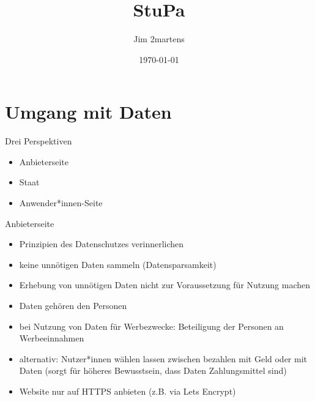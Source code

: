 \documentclass{beamer}
\begin{document}
\author{Jim 2martens}
\title{StuPa}
\date{\today}

\begin{frame}
    \titlepage
\end{frame}

\begin{frame}
    \tableofcontents
\end{frame}

\section{Umgang mit Daten}
\begin{frame}{Drei Perspektiven}
    \begin{itemize}
        \item Anbieterseite
        \vfill
        \item Staat
        \vfill
        \item Anwender*innen-Seite
    \end{itemize}
\end{frame}

\begin{frame}{Anbieterseite}
    \begin{itemize}
        \item Prinzipien des Datenschutzes verinnerlichen
        \vfill
        \item keine unnötigen Daten sammeln (Datensparsamkeit)
        \vfill
        \item Erhebung von unnötigen Daten nicht zur Voraussetzung für Nutzung
              machen
        \vfill
        \item Daten gehören den Personen
        \vfill
        \item bei Nutzung von Daten für Werbezwecke: Beteiligung der Personen
              an Werbeeinnahmen
        \vfill
        \item alternativ: Nutzer*innen wählen lassen zwischen bezahlen mit Geld
              oder mit Daten (sorgt für höheres Bewusstsein, dass Daten
              Zahlungsmittel sind)
        \vfill
        \item Website nur auf HTTPS anbieten (z.B. via Lets Encrypt)
    \end{itemize}
\end{frame}
\end{document}
